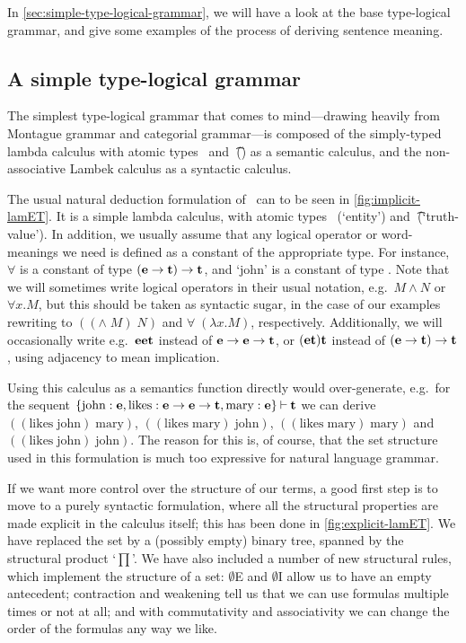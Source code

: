 In \autoref{sec:simple-type-logical-grammar}, we will have a look at
the base type-logical grammar, and give some examples of the process
of deriving sentence meaning.



\subsection{A simple type-logical grammar}
\label{sec:simple-type-logical-grammar}

The simplest type-logical grammar that comes to mind---drawing
heavily from Montague grammar and categorial grammar---is composed of
the simply-typed lambda calculus with atomic types \e\ and \t\ (\lamET) as
a semantic calculus, and the non-associative Lambek calculus
\citep[NL;][]{lambek1961} as a syntactic calculus.

The usual natural deduction formulation of \lamET\ can to be seen in
\autoref{fig:implicit-lamET}. It is a simple lambda
calculus, with atomic types \e\ (`entity') and \t\ (`truth-value').
In addition, we usually assume that any logical operator or
word-meanings we need is defined as a constant of the appropriate
type. For instance, $\forall$ is a constant of type $(\mathbf{e}\rightarrow\mathbf{t})\rightarrow\mathbf{t}$,
and `john' is a constant of type \e. Note that we will sometimes write
logical operators in their usual notation, e.g.\ $M\wedge N$ or
$\forall x.M$, but this should be taken as syntactic sugar, in the
case of our examples rewriting to $(({\wedge}\;M)\;N)$ and
$\forall\;(\lambda{x}.M)$, respectively. Additionally, we will
occasionally write e.g.\ $\mathbf{e}\mathbf{e}\mathbf{t}$ instead of $\mathbf{e}\rightarrow\mathbf{e}\rightarrow\mathbf{t}$, or
$(\mathbf{e}\mathbf{t})\mathbf{t}$ instead of $(\mathbf{e}\rightarrow\mathbf{t})\rightarrow\mathbf{t}$, using adjacency to mean
implication.

%

Using this calculus as a semantics function directly would
over-generate, e.g.\ for the sequent $\{\text{john}:\mathbf{e},
\text{likes}:\mathbf{e}\rightarrow\mathbf{e}\rightarrow\mathbf{t}, \text{mary}:\mathbf{e}\}\mathbin{\vdash}\mathbf{t}$ we can derive
$((\text{likes}\; \text{john})\; \text{mary})$, $((\text{likes}\;
\text{mary})\; \text{john})$, $((\text{likes}\; \text{mary})\;
\text{mary})$ and $((\text{likes}\; \text{john})\; \text{john})$.
The reason for this is, of course, that the set structure used in this
formulation is much too expressive for natural language grammar.

If we want more control over the structure of our terms, a good first
step is to move to a purely syntactic formulation, where all the
structural properties are made explicit in the calculus itself; this
has been done in \autoref{fig:explicit-lamET}. We have
replaced the set by a (possibly empty) binary tree, spanned by the
structural product `$\prod$'. We have also included a number of new
structural rules, which implement the structure of a set: $\emptyset$E
and $\emptyset$I allow us to have an empty antecedent; contraction and
weakening tell us that we can use formulas multiple times or not at
all; and with commutativity and associativity we can change the order
of the formulas any way we like.

